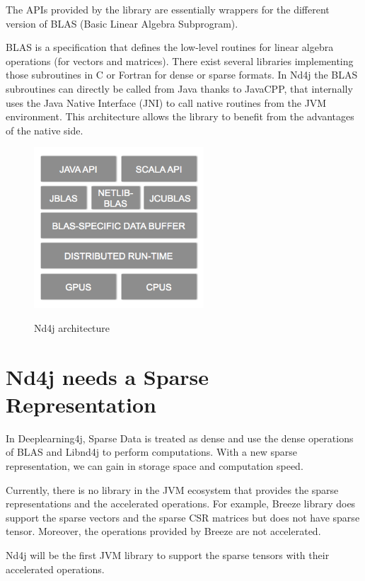 The APIs provided by the library are essentially wrappers for the different version of BLAS (Basic Linear Algebra Subprogram). 

BLAS is a specification that defines the low-level routines for linear algebra operations (for vectors and matrices). There exist several libraries implementing those subroutines in C or Fortran for dense or sparse formats. In Nd4j the BLAS subroutines can directly be called from Java thanks to JavaCPP, that internally uses the Java Native Interface (JNI) to call native routines from the JVM environment. This architecture allows the library to benefit from the advantages of the native side.

\begin{figure}[h]
	\begin{center}
		\includegraphics[width=2.5in]{images/nd4j_architecture.png} 
		\label{fig:hierachy}
		\caption{Nd4j architecture}
	\end{center}
\end{figure}

\section{Nd4j needs a Sparse Representation}

In Deeplearning4j, Sparse Data is treated as dense and use the dense operations of BLAS and Libnd4j to perform computations. With a new sparse representation, we can gain in storage space and computation speed.

Currently, there is no library in the JVM ecosystem that provides the sparse representations and the accelerated operations. For example, Breeze library \cite{breeze} does support the sparse vectors and the sparse CSR matrices but does not have sparse tensor. Moreover, the operations provided by Breeze are not accelerated. 

Nd4j will be the first JVM library to support the sparse tensors with their accelerated operations.
